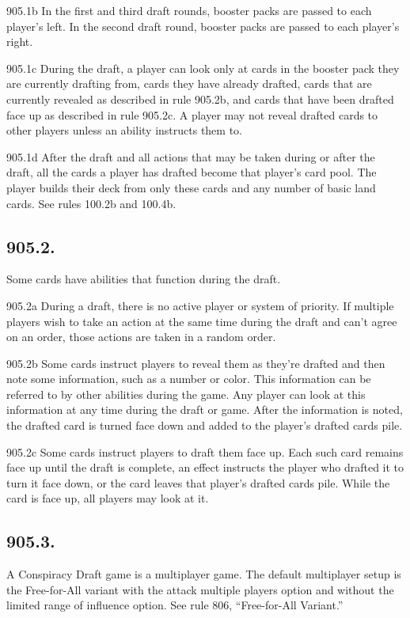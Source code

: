905.1b In the first and third draft rounds, booster packs are passed to each player’s left. In the second draft round, booster packs are passed to each player’s right.

905.1c During the draft, a player can look only at cards in the booster pack they are currently drafting from, cards they have already drafted, cards that are currently revealed as described in rule 905.2b, and cards that have been drafted face up as described in rule 905.2c. A player may not reveal drafted cards to other players unless an ability instructs them to.

905.1d After the draft and all actions that may be taken during or after the draft, all the cards a player has drafted become that player’s card pool. The player builds their deck from only these cards and any number of basic land cards. See rules 100.2b and 100.4b.

\subsection*{905.2.}
Some cards have abilities that function during the draft.

905.2a During a draft, there is no active player or system of priority. If multiple players wish to take an action at the same time during the draft and can’t agree on an order, those actions are taken in a random order.

905.2b Some cards instruct players to reveal them as they’re drafted and then note some information, such as a number or color. This information can be referred to by other abilities during the game. Any player can look at this information at any time during the draft or game. After the information is noted, the drafted card is turned face down and added to the player’s drafted cards pile.

905.2c Some cards instruct players to draft them face up. Each such card remains face up until the draft is complete, an effect instructs the player who drafted it to turn it face down, or the card leaves that player’s drafted cards pile. While the card is face up, all players may look at it.

\subsection*{905.3.}
A Conspiracy Draft game is a multiplayer game. The default multiplayer setup is the Free-for-All variant with the attack multiple players option and without the limited range of influence option. See rule 806, “Free-for-All Variant.”

